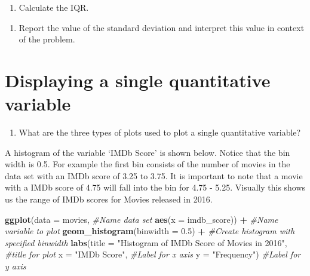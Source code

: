 \documentclass[
]{report}
\newenvironment{Shaded}{\begin{snugshade}}{\end{snugshade}}
\newcommand{\CommentTok}[1]{\textcolor[rgb]{0.56,0.35,0.01}{\textit{#1}}}
\newcommand{\DataTypeTok}[1]{\textcolor[rgb]{0.13,0.29,0.53}{#1}}
\newcommand{\FloatTok}[1]{\textcolor[rgb]{0.00,0.00,0.81}{#1}}
\newcommand{\KeywordTok}[1]{\textcolor[rgb]{0.13,0.29,0.53}{\textbf{#1}}}
\newcommand{\NormalTok}[1]{#1}
\newcommand{\OperatorTok}[1]{\textcolor[rgb]{0.81,0.36,0.00}{\textbf{#1}}}
\newcommand{\StringTok}[1]{\textcolor[rgb]{0.31,0.60,0.02}{#1}}
\providecommand{\tightlist}{%
  \setlength{\itemsep}{0pt}\setlength{\parskip}{0pt}}
\begin{document}
\vspace{0.5in}

\begin{enumerate}
\def\labelenumi{\arabic{enumi}.}
\setcounter{enumi}{4}
\tightlist
\item
  Calculate the IQR.
\end{enumerate}

\vspace{0.5in}

\begin{enumerate}
\def\labelenumi{\arabic{enumi}.}
\setcounter{enumi}{5}
\tightlist
\item
  Report the value of the standard deviation and interpret this value in context of the problem.
  \vspace{1in}
\end{enumerate}

\hypertarget{displaying-a-single-quantitative-variable}{%
\section{Displaying a single quantitative variable}\label{displaying-a-single-quantitative-variable}}

\begin{enumerate}
\def\labelenumi{\arabic{enumi}.}
\setcounter{enumi}{6}
\tightlist
\item
  What are the three types of plots used to plot a single quantitative variable?
\end{enumerate}

\newpage

A histogram of the variable `IMDb Score' is shown below. Notice that the bin width is 0.5. For example the first bin consists of the number of movies in the data set with an IMDb score of 3.25 to 3.75. It is important to note that a movie with a IMDb score of 4.75 will fall into the bin for 4.75 - 5.25. Visually this shows us the range of IMDb scores for Movies released in 2016.

\begin{Shaded}
\begin{Highlighting}[]
\KeywordTok{ggplot}\NormalTok{(}\DataTypeTok{data =}\NormalTok{ movies,   }\CommentTok{#Name data set}
       \KeywordTok{aes}\NormalTok{(}\DataTypeTok{x =}\NormalTok{ imdb_score)) }\OperatorTok{+}\StringTok{   }\CommentTok{#Name variable to plot}
\StringTok{  }\KeywordTok{geom_histogram}\NormalTok{(}\DataTypeTok{binwidth =} \FloatTok{0.5}\NormalTok{) }\OperatorTok{+}\StringTok{  }\CommentTok{#Create histogram with specified binwidth}
\StringTok{  }\KeywordTok{labs}\NormalTok{(}\DataTypeTok{title =} \StringTok{"Histogram of IMDb Score of Movies in 2016"}\NormalTok{, }\CommentTok{#title for plot}
       \DataTypeTok{x =} \StringTok{"IMDb Score"}\NormalTok{, }\CommentTok{#Label for x axis}
       \DataTypeTok{y =} \StringTok{"Frequency"}\NormalTok{) }\CommentTok{#Label for y axis}
\end{Highlighting}
\end{Shaded}
\end{document}
